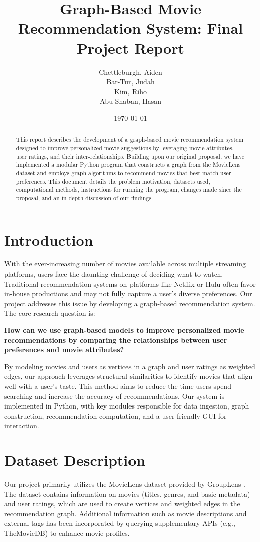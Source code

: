 \documentclass[12pt]{article}
\title{Graph-Based Movie Recommendation System: Final Project Report}
\author{
    Chettleburgh, Aiden \\
    Bar-Tur, Judah \\
    Kim, Riho \\
    Abu Shaban, Hasan
}
\date{\today}
\begin{document}
\maketitle

\begin{abstract}
This report describes the development of a graph-based movie recommendation system designed to improve personalized movie suggestions by leveraging movie attributes, user ratings, and their inter-relationships. Building upon our original proposal, we have implemented a modular Python program that constructs a graph from the MovieLens dataset and employs graph algorithms to recommend movies that best match user preferences. This document details the problem motivation, datasets used, computational methods, instructions for running the program, changes made since the proposal, and an in-depth discussion of our findings.
\end{abstract}

\section{Introduction}
With the ever-increasing number of movies available across multiple streaming platforms, users face the daunting challenge of deciding what to watch. Traditional recommendation systems on platforms like Netflix or Hulu often favor in-house productions and may not fully capture a user’s diverse preferences. Our project addresses this issue by developing a graph-based recommendation system. The core research question is:

\begin{center}
\textbf{How can we use graph-based models to improve personalized movie recommendations by comparing the relationships between user preferences and movie attributes?}
\end{center}

By modeling movies and users as vertices in a graph and user ratings as weighted edges, our approach leverages structural similarities to identify movies that align well with a user’s taste. This method aims to reduce the time users spend searching and increase the accuracy of recommendations. Our system is implemented in Python, with key modules responsible for data ingestion, graph construction, recommendation computation, and a user-friendly GUI for interaction.

\section{Dataset Description}
Our project primarily utilizes the MovieLens dataset provided by GroupLens \cite{GroupLens}. The dataset contains information on movies (titles, genres, and basic metadata) and user ratings, which are used to create vertices and weighted edges in the recommendation graph. Additional information such as movie descriptions and external tags has been incorporated by querying supplementary APIs (e.g., TheMovieDB) to enhance movie profiles.
\end{document}
